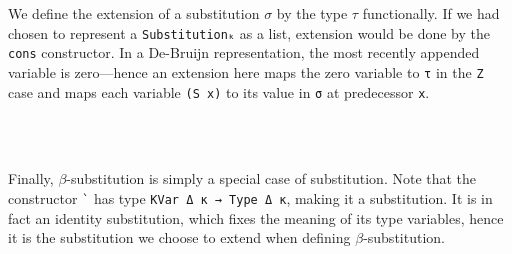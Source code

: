 \documentclass[authoryear, acmsmall, screen, review, nonacm]{acmart}
\begin{document}
We define the extension of a substitution $\sigma$ by the type $\tau$ functionally. If we had chosen to represent a \verb!Substitutionₖ! as a list, extension would be done by the \verb!cons! constructor. In a De-Bruijn representation, the most recently appended variable is zero---hence an extension here maps the zero variable to \verb!τ! in the \verb!Z! case and maps each variable \verb!(S x)! to its value in \verb!σ! at predecessor \verb!x!.

\begin{code}%
\>[0]\AgdaSpace{}%
\AgdaSymbol{:}\AgdaSpace{}%
\AgdaSpace{}%
\AgdaSpace{}%
\AgdaSpace{}%
\AgdaSpace{}%
\AgdaSymbol{(}\AgdaSpace{}%
\AgdaSymbol{:}\AgdaSpace{}%
\AgdaSpace{}%
\AgdaSpace{}%
\AgdaSymbol{)}\AgdaSpace{}%
\AgdaSpace{}%
\AgdaSpace{}%
\AgdaSymbol{(}\AgdaSpace{}%
\AgdaOperator{\AgdaInductiveConstructor{,,}}\AgdaSpace{}%
\AgdaSymbol{)}\AgdaSpace{}%
\<%
\\
\>[0]\AgdaSpace{}%
\AgdaSpace{}%
\AgdaSpace{}%
\AgdaSpace{}%
\AgdaSymbol{=}\AgdaSpace{}%
\<%
\\
\>[0]\AgdaSpace{}%
\AgdaSpace{}%
\AgdaSpace{}%
\AgdaSymbol{(}\AgdaSpace{}%
\AgdaSymbol{)}\AgdaSpace{}%
\AgdaSymbol{=}\AgdaSpace{}%
\AgdaSpace{}%
\<%
\end{code}

Finally, $\beta$-substitution is simply a special case of substitution. Note that the constructor \verb!`! has type \verb!KVar Δ κ → Type Δ κ!, making it a substitution. It is in fact an identity substitution, which fixes the meaning of its type variables, hence it is the substitution we choose to extend when defining $\beta$-substitution.

\begin{code}%
\>[0]\AgdaSpace{}%
\AgdaSymbol{:}\AgdaSpace{}%
\AgdaSpace{}%
\AgdaSymbol{(}\AgdaSpace{}%
\AgdaOperator{\AgdaInductiveConstructor{,,}}\AgdaSpace{}%
\AgdaSymbol{)}\AgdaSpace{}%
\AgdaSpace{}%
\AgdaSpace{}%
\AgdaSpace{}%
\AgdaSpace{}%
\AgdaSpace{}%
\AgdaSpace{}%
\AgdaSpace{}%
\AgdaSpace{}%
\<%
\\
\>[0]\AgdaSpace{}%
\AgdaOperator{\AgdaFunction{βₖ[}}\AgdaSpace{}%
\AgdaSpace{}%
\AgdaOperator{\AgdaFunction{]}}\AgdaSpace{}%
\AgdaSymbol{=}\AgdaSpace{}%
\AgdaSpace{}%
\AgdaSymbol{(}\AgdaSpace{}%
\AgdaSpace{}%
\AgdaSymbol{)}\AgdaSpace{}%
\<%
\end{code}
\end{document}

